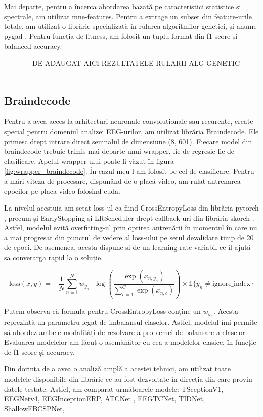 Mai departe, pentru a încerca abordarea bazată pe caracteristici statistice și spectrale, am utilizat mne-features. Pentru a extrage un subset din feature-urile totale, am utilizat o librărie specializată în rularea algoritmilor genetici, și anume pygad \cite{pygad}. Pentru funcția de fitness, am folosit un tuplu format din f1-score și balanced-accuracy.

------------DE ADAUGAT AICI REZULTATELE RULARII ALG GENETIC------------

\subsection{Braindecode}
Pentru a avea acces la arhitecturi neuronale convolutionale sau recurente, create special pentru domeniul analizei EEG-urilor, am utilizat librăria Braindecode. Ele primesc drept intrare direct semnalul de dimensiune (8, 601). Fiecare model din braindecode trebuie trimis mai departe unui wrapper, fie de regresie fie de clasificare. Apelul wrapper-ului poate fi văzut în figura \ref{fig:wrapper_braindecode}. În cazul meu l-am folosit pe cel de clasificare. Pentru a mări viteza de procesare, dispunând de o placă video, am rulat antrenarea epocilor pe placa video folosind cuda.

La nivelul acestuia am setat loss-ul ca fiind CrossEntropyLoss din librăria pytorch \cite{pytorch}, precum și EarlyStopping și LRScheduler drept callback-uri din librăria skorch \cite{skorch}. Astfel, modelul evită overfitting-ul prin oprirea antrenării în momentul în care nu a mai progresat din punctul de vedere al loss-ului pe setul devalidare timp de 20 de epoci. De asemenea, acesta dispune și de un learning rate variabil ce îl ajută sa converarga rapid la o soluție. 

\begin{equation}
    \text{loss}(x, y) = -\frac{1}{N} \sum_{n=1}^{N} w_{y_n} \cdot \log\left(\frac{\exp(x_{n,y_n})}{\sum_{c=1}^{C} \exp(x_{n,c})}\right) \times \mathbb{1}\{y_n \neq \text{ignore\_index}\}
\end{equation}

Putem observa că formula pentru CrossEntropyLoss conține un \(w_{y_n}\). Acesta reprezintă un parametru legat de imbalansul claselor. Astfel, modelul îmi permite să abordez ambele modalități de rezolvare a problemei de balansare a claselor. Evaluarea modelelor am făcut-o asemănător cu cea a modelelor clasice, în funcție de f1-score și accuracy.

Din dorința de a avea o analiză amplă a acestei tehnici, am utilizat toate modelele disponibile din librărie ce au fost dezvoltate în direcția din care provin datele testate. Astfel, am comparat următoarele modele: TSceptionV1, EEGNetv4\cite{eegnetv4}, EEGInceptionERP\cite{eeginceptionerp}, ATCNet \cite{atcnet1}\cite{atcnet2}\cite{atcnet3}, EEGTCNet\cite{tcnet}, TIDNet\cite{tidnet}, ShallowFBCSPNet\cite{ShallowFBCSPNet}, 

